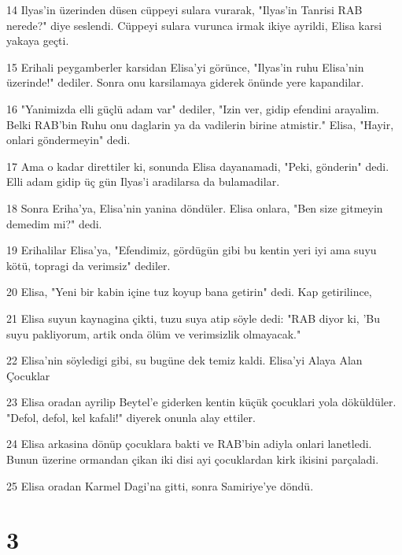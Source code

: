 \par 14 Ilyas'in üzerinden düsen cüppeyi sulara vurarak, "Ilyas'in Tanrisi RAB nerede?" diye seslendi. Cüppeyi sulara vurunca irmak ikiye ayrildi, Elisa karsi yakaya geçti.
\par 15 Erihali peygamberler karsidan Elisa'yi görünce, "Ilyas'in ruhu Elisa'nin üzerinde!" dediler. Sonra onu karsilamaya giderek önünde yere kapandilar.
\par 16 "Yanimizda elli güçlü adam var" dediler, "Izin ver, gidip efendini arayalim. Belki RAB'bin Ruhu onu daglarin ya da vadilerin birine atmistir." Elisa, "Hayir, onlari göndermeyin" dedi.
\par 17 Ama o kadar direttiler ki, sonunda Elisa dayanamadi, "Peki, gönderin" dedi. Elli adam gidip üç gün Ilyas'i aradilarsa da bulamadilar.
\par 18 Sonra Eriha'ya, Elisa'nin yanina döndüler. Elisa onlara, "Ben size gitmeyin demedim mi?" dedi.
\par 19 Erihalilar Elisa'ya, "Efendimiz, gördügün gibi bu kentin yeri iyi ama suyu kötü, topragi da verimsiz" dediler.
\par 20 Elisa, "Yeni bir kabin içine tuz koyup bana getirin" dedi. Kap getirilince,
\par 21 Elisa suyun kaynagina çikti, tuzu suya atip söyle dedi: "RAB diyor ki, 'Bu suyu pakliyorum, artik onda ölüm ve verimsizlik olmayacak."
\par 22 Elisa'nin söyledigi gibi, su bugüne dek temiz kaldi. Elisa'yi Alaya Alan Çocuklar
\par 23 Elisa oradan ayrilip Beytel'e giderken kentin küçük çocuklari yola döküldüler. "Defol, defol, kel kafali!" diyerek onunla alay ettiler.
\par 24 Elisa arkasina dönüp çocuklara bakti ve RAB'bin adiyla onlari lanetledi. Bunun üzerine ormandan çikan iki disi ayi çocuklardan kirk ikisini parçaladi.
\par 25 Elisa oradan Karmel Dagi'na gitti, sonra Samiriye'ye döndü.

\chapter{3}

